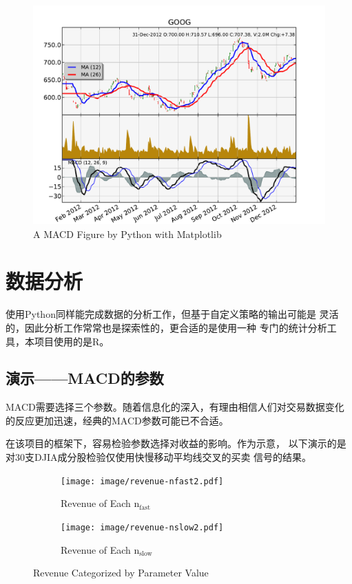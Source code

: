 \documentclass{article}
\begin{document}
\begin{figure}[H]
\centering
\includegraphics[width=\textwidth]{image/macd-plot.pdf}
\caption{A MACD Figure by Python with Matplotlib\label{fig:macd-plot}}
\end{figure}

\section{数据分析}
使用Python同样能完成数据的分析工作，但基于自定义策略的输出可能是
灵活的，因此分析工作常常也是探索性的，更合适的是使用一种
专门的统计分析工具，本项目使用的是R。

\subsection{演示——MACD的参数}
MACD需要选择三个参数。随着信息化的深入，有理由相信人们对交易数据变化
的反应更加迅速，经典的MACD参数可能已不合适。


在该项目的框架下，容易检验参数选择对收益的影响。作为示意，
以下演示的是对30支DJIA成分股检验仅使用快慢移动平均线交叉的买卖
信号的结果。

\begin{figure}[H]
\begin{subfigure}[b]{.5\textwidth}
\centering
\texttt{[image: image/revenue-nfast2.pdf]}
\caption{Revenue of Each $\mathrm{n_{fast}}$}
\label{fig:revenue-by-par:nfast}
\end{subfigure}
\begin{subfigure}[b]{.5\textwidth}
\centering
\texttt{[image: image/revenue-nslow2.pdf]}
\caption{Revenue of Each $\mathrm{n_{slow}}$}
\label{fig:revenue-by-par:nslow}
\end{subfigure}
\caption{Revenue Categorized by Parameter Value}
\label{fig:revenue-by-par}
\end{figure}
\end{document}
